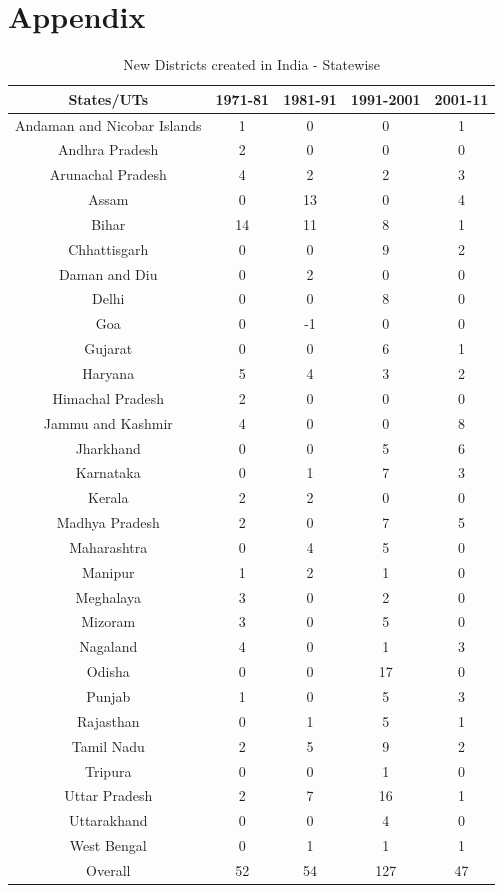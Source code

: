\documentclass[12pt, a4paper]{article}
\begin{document}
\section*{Appendix}
\begin{table}[h!]
	\centering
	\caption{New Districts created in India - Statewise}
	\label{Fig1}
	\begin{tabular}{c|cccc} 
		\hline
		States/UTs & 1971-81 & 1981-91 & 1991-2001 & 2001-11 \\
		\hline 
		Andaman and Nicobar Islands & 1 & 0 & 0 & 1  \\ 
		Andhra Pradesh & 2 & 0 & 0 & 0  \\ 
		Arunachal Pradesh & 4 & 2 & 2 & 3  \\ 
		Assam & 0 & 13 & 0 & 4  \\ 
		Bihar & 14 & 11 & 8 & 1  \\ 
		Chhattisgarh & 0 & 0 & 9 & 2  \\ 
		Daman and Diu & 0 & 2 & 0 & 0  \\ 
		Delhi & 0 & 0 & 8 & 0  \\ 
		Goa & 0 & -1 & 0 & 0  \\ 
		Gujarat & 0 & 0 & 6 & 1  \\ 
		Haryana & 5 & 4 & 3 & 2  \\ 
		Himachal Pradesh & 2 & 0 & 0 & 0  \\ 
		Jammu and Kashmir & 4 & 0 & 0 & 8  \\ 
		Jharkhand & 0 & 0 & 5 & 6  \\ 
		Karnataka & 0 & 1 & 7 & 3  \\ 
		Kerala & 2 & 2 & 0 & 0  \\ 
		Madhya Pradesh & 2 & 0 & 7 & 5  \\ 
		Maharashtra & 0 & 4 & 5 & 0  \\ 
		Manipur & 1 & 2 & 1 & 0  \\ 
		Meghalaya & 3 & 0 & 2 & 0  \\ 
		Mizoram & 3 & 0 & 5 & 0  \\ 
		Nagaland & 4 & 0 & 1 & 3  \\ 
		Odisha & 0 & 0 & 17 & 0  \\ 
		Punjab & 1 & 0 & 5 & 3  \\ 
		Rajasthan & 0 & 1 & 5 & 1  \\ 
		Tamil Nadu & 2 & 5 & 9 & 2  \\ 
		Tripura & 0 & 0 & 1 & 0  \\ 
		Uttar Pradesh & 2 & 7 & 16 & 1  \\ 
		Uttarakhand & 0 & 0 & 4 & 0  \\ 
		West Bengal & 0 & 1 & 1 & 1  \\ 
		\hline
		Overall & 52 & 54 & 127 & 47  \\ 
		\hline
	\end{tabular}
\end{table}
\end{document}

